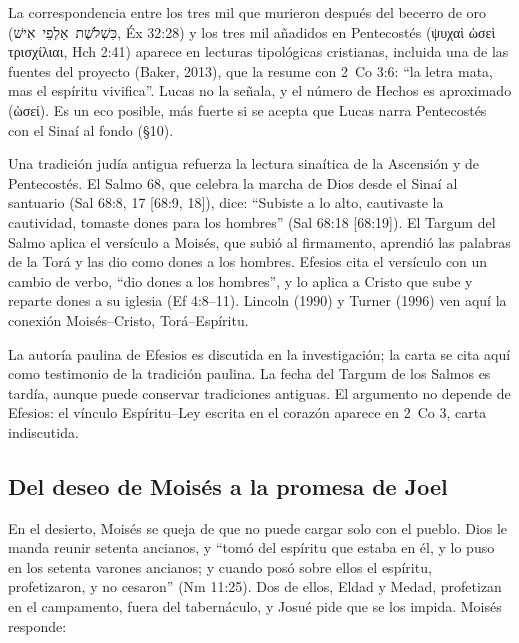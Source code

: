 \documentclass[11pt,letterpaper]{article}
\newcommand{\heb}[1]{\mbox{\foreignlanguage{hebrew}{#1}}}
\newcommand{\grc}[1]{\foreignlanguage{ancientgreek}{#1}}
\begin{document}
\begin{nota}
La correspondencia entre los tres mil que murieron después del becerro de oro (\heb{כִּשְׁלֹשֶׁת אַלְפֵי אִישׁ}, Éx 32:28) y los tres mil añadidos en Pentecostés (\grc{ψυχαὶ ὡσεὶ τρισχίλιαι}, Hch 2:41) aparece en lecturas tipológicas cristianas, incluida una de las fuentes del proyecto (Baker, 2013), que la resume con 2~Co 3:6: ``la letra mata, mas el espíritu vivifica''. Lucas no la señala, y el número de Hechos es aproximado (\grc{ὡσεί}). Es un eco posible, más fuerte si se acepta que Lucas narra Pentecostés con el Sinaí al fondo (§10).
\end{nota}

Una tradición judía antigua refuerza la lectura sinaítica de la Ascensión y de Pentecostés. El Salmo 68, que celebra la marcha de Dios desde el Sinaí al santuario (Sal 68:8, 17 [68:9, 18]), dice: ``Subiste a lo alto, cautivaste la cautividad, tomaste dones para los hombres'' (Sal 68:18 [68:19]). El Targum del Salmo aplica el versículo a Moisés, que subió al firmamento, aprendió las palabras de la Torá y las dio como dones a los hombres. Efesios cita el versículo con un cambio de verbo, ``dio dones a los hombres'', y lo aplica a Cristo que sube y reparte dones a su iglesia (Ef 4:8--11). Lincoln (1990) y Turner (1996) ven aquí la conexión Moisés--Cristo, Torá--Espíritu.

\begin{nota}[Precisión]
La autoría paulina de Efesios es discutida en la investigación; la carta se cita aquí como testimonio de la tradición paulina. La fecha del Targum de los Salmos es tardía, aunque puede conservar tradiciones antiguas. El argumento no depende de Efesios: el vínculo Espíritu--Ley escrita en el corazón aparece en 2~Co 3, carta indiscutida.
\end{nota}

\subsection{Del deseo de Moisés a la promesa de Joel}

En el desierto, Moisés se queja de que no puede cargar solo con el pueblo. Dios le manda reunir setenta ancianos, y ``tomó del espíritu que estaba en él, y lo puso en los setenta varones ancianos; y cuando posó sobre ellos el espíritu, profetizaron, y no cesaron'' (Nm 11:25). Dos de ellos, Eldad y Medad, profetizan en el campamento, fuera del tabernáculo, y Josué pide que se los impida. Moisés responde:
\end{document}
